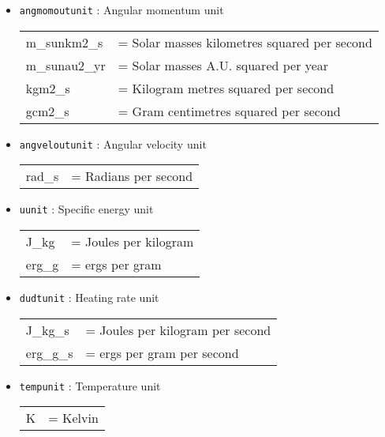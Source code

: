 \documentclass[a4paper]{article}
\newcommand{\var}[1]{\texttt{#1}}
\begin{document}
\begin{itemize}
\item \var{angmomoutunit} : Angular momentum unit \\
\begin{tabular}{ll}
m\_sunkm2\_s  & = Solar masses kilometres squared per second \\
m\_sunau2\_yr & = Solar masses A.U. squared per year \\
kgm2\_s       & = Kilogram metres squared per second \\
gcm2\_s       & = Gram centimetres squared per second
\end{tabular}

\item \var{angveloutunit} : Angular velocity unit \\
\begin{tabular}{ll}
rad\_s & = Radians per second
\end{tabular}






\item \var{uunit} : Specific energy unit \\
\begin{tabular}{ll}
J\_kg  & = Joules per kilogram \\
erg\_g & = ergs per gram
\end{tabular}


\item \var{dudtunit} : Heating rate unit \\
\begin{tabular}{ll}
J\_kg\_s  & = Joules per kilogram per second \\
erg\_g\_s & = ergs per gram per second
\end{tabular}

\item \var{tempunit} : Temperature unit \\
\begin{tabular}{ll}
K & = Kelvin
\end{tabular}

\end{itemize}
\end{document}
